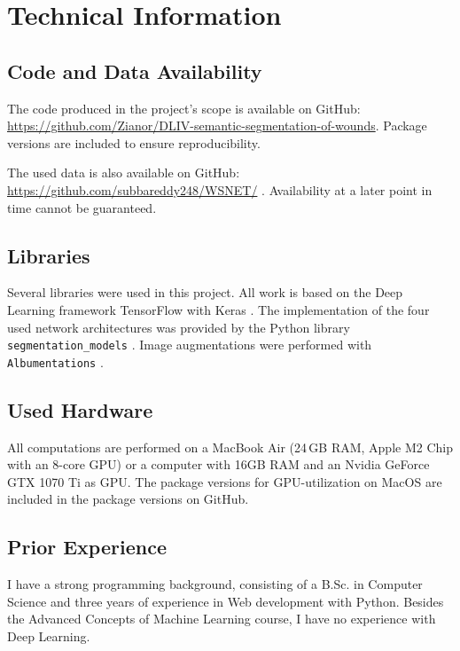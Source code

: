 \section{Technical Information}

\subsection{Code and Data Availability}

The code produced in the project's scope is available on GitHub: \url{https://github.com/Zianor/DLIV-semantic-segmentation-of-wounds}. Package versions are included to ensure reproducibility.

The used data is also available on GitHub:
\url{https://github.com/subbareddy248/WSNET/} \cite{Oota_2021_WACV, Oota_2023_WACV}. Availability at a later point in time cannot be guaranteed.

\subsection{Libraries}

Several libraries were used in this project. All work is based on the Deep Learning framework TensorFlow with Keras \cite{tensorflow2015-whitepaper, chollet2015keras}. The implementation of the four used network architectures was provided by the Python library \texttt{segmentation\_models} \cite{SegmentationModels}. Image augmentations were performed with \texttt{Albumentations} \cite{albumentations}.

\subsection{Used Hardware}

All computations are performed on a MacBook Air (24\,GB RAM, Apple M2 Chip with an 8-core GPU) or a computer with 16GB RAM and an Nvidia GeForce GTX 1070 Ti as GPU. The package versions for GPU-utilization on MacOS are included in the package versions on GitHub.

\subsection{Prior Experience}

I have a strong programming background, consisting of a B.Sc. in Computer Science and three years of experience in Web development with Python. Besides the Advanced Concepts of Machine Learning course, I have no experience with Deep Learning.

